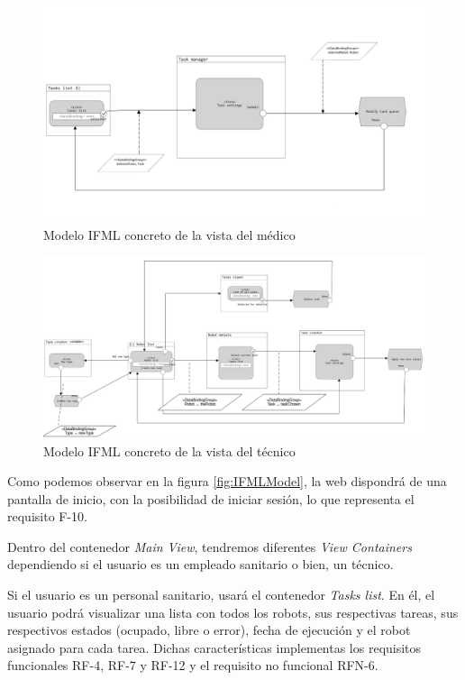 \begin{figure}[H]
	\centering
	\includegraphics[width=1\textwidth]{images/Doctor-IFML.png}
	\caption{Modelo IFML concreto de la vista del médico}
	\label{fig:IFMLDoctor}
\end{figure}

\begin{figure}[H]
	\centering
	\includegraphics[width=1\textwidth]{images/Tech-IFML.png}
	\caption{Modelo IFML concreto de la vista del técnico}
	\label{fig:IFMLTech}
\end{figure}

Como podemos observar en la figura \ref{fig:IFMLModel}, la web dispondrá de una pantalla de inicio, con la posibilidad de iniciar sesión, lo que representa el requisito F-10.

Dentro del contenedor \textit{Main View}, tendremos diferentes \textit{View Containers} dependiendo si el usuario es un empleado sanitario o bien, un técnico.

Si el usuario es un personal sanitario, usará el contenedor \textit{Tasks list}. En él, el usuario podrá visualizar una lista con todos los robots, sus respectivas tareas, sus respectivos estados (ocupado, libre o error), fecha de ejecución y el robot asignado para cada tarea. Dichas características implementas los requisitos funcionales RF-4, RF-7 y RF-12 y el requisito no funcional RFN-6.

